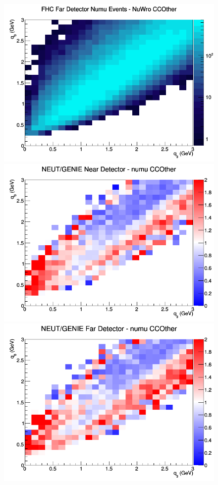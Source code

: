 \documentclass[12pt]{article}
\begin{document}
\begin{figure}[h]
\endminipage
{}
\includegraphics[width=\linewidth]{eff_q0_q3/LAr/CCOther_FHC_FD_numu_q3_q0_NuWro.png}
\endminipage
\newline
{}
\includegraphics[width=\linewidth]{eff_q0_q3/LAr/ratios/CCOther_NEUT_GENIE_numu_near_q3_q0.png}
\endminipage
{}
\includegraphics[width=\linewidth]{eff_q0_q3/LAr/ratios/CCOther_NEUT_GENIE_numu_far_q3_q0.png}

\end{figure}
\end{document}
